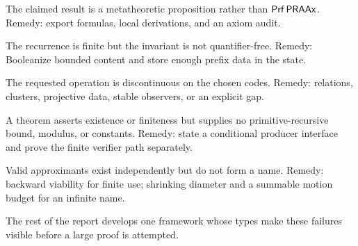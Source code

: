 \begin{description}[style=nextline,leftmargin=2.2em]
\item[Logical boundary failure.] The claimed result is a metatheoretic proposition rather than \(\mathsf{Prf}\,\mathsf{PRAAx}\).  Remedy: export formulas, local derivations, and an axiom audit.
\item[Induction-shape failure.] The recurrence is finite but the invariant is not quantifier-free.  Remedy: Booleanize bounded content and store enough prefix data in the state.
\item[Representation failure.] The requested operation is discontinuous on the chosen codes.  Remedy: relations, clusters, projective data, stable observers, or an explicit gap.
\item[Effectivity failure.] A theorem asserts existence or finiteness but supplies no primitive-recursive bound, modulus, or constants.  Remedy: state a conditional producer interface and prove the finite verifier path separately.
\item[Coherence failure.] Valid approximants exist independently but do not form a name.  Remedy: backward viability for finite use; shrinking diameter and a summable motion budget for an infinite name.
\end{description}

The rest of the report develops one framework whose types make these failures visible before a large proof is attempted.
